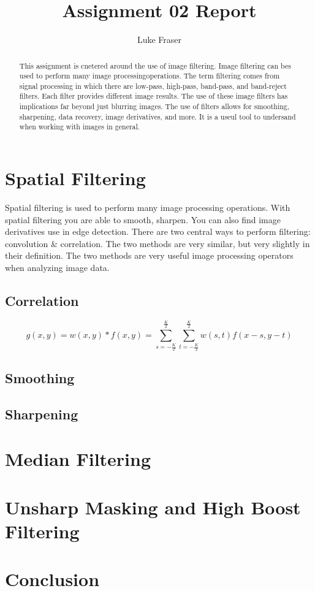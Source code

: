 \documentclass[letterpaper,10pt]{article}
\title{Assignment 02 Report}
\author{Luke Fraser}
\begin{document}
\maketitle

\begin{abstract}
This assignment is cnetered around the use of image filtering. Image filtering can bes used to perform many image processingoperations. The term filtering comes from signal processing in which there are low-pass, high-pass, band-pass, and band-reject filters. Each filter provides different image results. The use of these image filters has implications far beyond just blurring images. The use of filters allows for smoothing, sharpening, data recovery, image derivatives, and more. It is a useul tool to undersand when working with images in general.
\end{abstract}

\section{Spatial Filtering}
Spatial filtering is used to perform many image processing operations. With spatial filtering you are able to smooth, sharpen. You can also find image derivatives use in edge detection. There are two central ways to perform filtering: convolution \& correlation. The two methods are very similar, but very slightly in their definition. The two methods are very useful image processing operators when analyzing image data.

\subsection{Correlation}
\begin{equation}
 g(x,y)=w(x,y)*f(x,y)=\sum_{s=-\frac{K}{2}}^{\frac{K}{2}}\sum_{t=-\frac{K}{2}}^{\frac{K}{2}}w(s,t)f(x-s,y-t)
\end{equation}
\subsection{Smoothing}
\subsection{Sharpening}

\section{Median Filtering}
\section{Unsharp Masking and High Boost Filtering}

\section{Conclusion}
\end{document}
